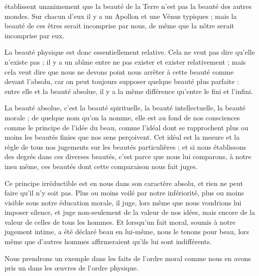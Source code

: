 \documentclass[a4paper, 11pt, oneside, landscape]{article}
\begin{document}
établissent unanimement que la beauté de la Terre n'est pas la beauté des autres mondes. Sur chacun d'eux il y a un Apollon et une Vénus typiques ; mais la beauté de ces êtres serait incomprise par nous, de même que la nôtre serait incomprise par eux.

La beauté physique est donc essentiellement relative. Cela ne veut pas dire qu'elle n'existe pas ; il y a un abîme entre ne pas exister et exister relativement ; mais cela veut dire que nous ne devons point nous arrêter à cette beauté comme devant l'absolu, car on peut toujours supposer quelque beauté plus parfaite : entre elle et la beauté absolue, il y a la même différence qu'entre le fini et l'infini.

La beauté absolue, c'est la beauté spirituelle, la beauté intellectuelle, la beauté morale ; de quelque nom qu'on la nomme, elle est au fond de nos consciences comme le principe de l'idée du beau, comme l'idéal dont se rapprochent plus ou moins les beautés finies que nos sens perçoivent. Cet idéal est la mesure et la règle de tous nos jugements sur les beautés particulières ; et si nous établissons des degrés dans ces diverses beautés, c'est parce que nous lui comparons, à notre insu même, ces beautés dont cette comparaison nous fait juges.

Ce principe irréductible est en nous dans son caractère absolu, et rien ne peut faire qu'il n'y soit pas. Plus ou moins voilé par notre infériorité, plus ou moins visible sous notre éducation morale, il juge, lors même que nous voudrions lui imposer silence, et juge non-seulement de la valeur de nos idées, mais encore de la valeur de celles de tous les hommes. Et lorsqu'un fait moral, soumis à notre jugement intime, a été déclaré beau en lui-même, nous le tenons pour beau, lors même que d'autres hommes affirmeraient qu'ils lui sont indifférents.

Nous prendrons un exemple dans les faits de l'ordre moral comme nous en avons pris un dans les œuvres de l'ordre physique.
\end{document}

